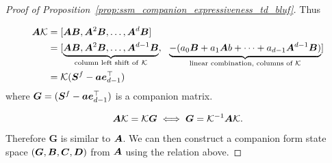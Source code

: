 \begin{proof}[Proof of Proposition~\ref{prop:ssm_companion_expressiveness_td_bluf}]
Thus

\[
    \begin{aligned}
    \boldsymbol{A} \mathcal{K} &= [\boldsymbol{A} \boldsymbol{B}, \boldsymbol{A}^2 \boldsymbol{B}, \dots, \boldsymbol{A}^d \boldsymbol{B}]\\
    &= [\underbrace{\boldsymbol{A}\boldsymbol{B}, \boldsymbol{A}^2 \boldsymbol{B}, \dots, \boldsymbol{A}^{d-1}\boldsymbol{B}}_{\text{column left shift of}~\mathcal{K}},~~ \underbrace{ - (a_0 \boldsymbol{B} + a_1 \boldsymbol{A} b + \dots + a_{d-1}\boldsymbol{A}^{d-1} \boldsymbol{B})}_{\text{linear combination, columns of $\mathcal{K}$}}] \\
    &= \mathcal{K} (\boldsymbol{S}^f - \boldsymbol{a} \boldsymbol{e}_{d-1}^\top )
    \end{aligned}
\]
%
where $\boldsymbol{G} = (\boldsymbol{S}^f - \boldsymbol{a} \boldsymbol{e}_{d-1}^\top)$ is a companion matrix. 

\[
\boldsymbol{A} \mathcal{K} = \mathcal{K} \boldsymbol{G} \iff \boldsymbol{G}= \mathcal{K} ^{-1}\boldsymbol{A} \mathcal{K}. 
\]

Therefore $\boldsymbol{G}$ is similar to $\boldsymbol{A}$. We can then construct a companion form state space $(\boldsymbol{G}, \boldsymbol{B}, \boldsymbol{C}, \boldsymbol{D})$ from $\boldsymbol{A}$ using the relation above.

\end{proof}


